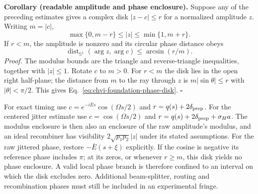 \noindent\textbf{Corollary (readable amplitude and phase enclosure).}
Suppose any of the preceding estimates gives a complex disk
$|z-c|\leq r$ for a normalized amplitude $z$. Writing $m=|c|$,
\begin{equation}
 \max\{0,m-r\}\leq |z|\leq\min\{1,m+r\}.
\label{eq:chvi-foundation-modulus-disk}
\end{equation}
If $r<m$, the amplitude is nonzero and its circular phase distance obeys
\begin{equation}
 \operatorname{dist}_{\mathbb S^1}(\arg z,\arg c)
 \leq\arcsin(r/m).
\label{eq:chvi-foundation-phase-disk}
\end{equation}
\emph{Proof.} The modulus bounds are the triangle and reverse-triangle
inequalities, together with $|z|\leq1$. Rotate $c$ to $m>0$.
For $r<m$ the disk lies in the open right half-plane; the distance from
$m$ to the ray through $z$ is $m|\sin\theta|\leq r$ with
$|\theta|<\pi/2$. This gives Eq.~\eqref{eq:chvi-foundation-phase-disk}.
$\square$

For exact timing use $c=e^{-i\bar Es}\cos(\Omega s/2)$ and
$r=q(s)+2\delta_{\rm prep}$. For the centered jitter estimate use
$c=\cos(\Omega s/2)$ and
$r=q(s)+2\delta_{\rm prep}+\sigma_Ha$.
The modulus enclosure is then also an enclosure of the raw amplitude's
modulus, and an ideal recombiner has visibility
$2\sqrt{p_1p_2}|z|$ under its stated assumptions.
For the raw jittered phase, restore $-\bar E(s+\xi)$ explicitly.
If the cosine is negative its reference phase includes $\pi$; at its
zeros, or whenever $r\geq m$, this disk yields no phase enclosure.
A valid local phase branch is therefore confined to an interval on
which the disk excludes zero. Additional beam-splitter, routing and
recombination phases must still be included in an experimental fringe.

